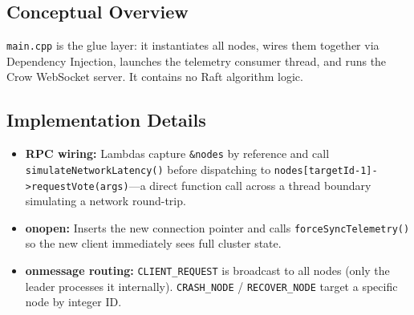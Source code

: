 \documentclass[11pt, a4paper]{article}
\begin{document}
\subsection{Conceptual Overview}
\texttt{main.cpp} is the glue layer: it instantiates all nodes, wires them
together via Dependency Injection, launches the telemetry consumer thread,
and runs the Crow WebSocket server. It contains no Raft algorithm logic.

\subsection{Implementation Details}
\begin{itemize}[leftmargin=*]
    \item \textbf{RPC wiring:} Lambdas capture \texttt{\&nodes} by reference
          and call \texttt{simulateNetworkLatency()} before dispatching to
          \texttt{nodes[targetId-1]->requestVote(args)}---a direct function
          call across a thread boundary simulating a network round-trip.
    \item \textbf{onopen:} Inserts the new connection pointer and calls
          \texttt{forceSyncTelemetry()} so the new client immediately sees
          full cluster state.
    \item \textbf{onmessage routing:} \texttt{CLIENT\_REQUEST} is broadcast
          to all nodes (only the leader processes it internally).
          \texttt{CRASH\_NODE} / \texttt{RECOVER\_NODE} target a specific
          node by integer ID.
\end{itemize}
\end{document}
